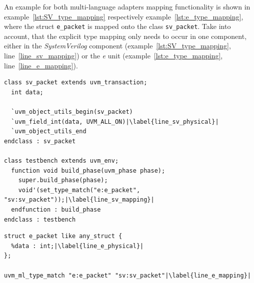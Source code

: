An example for both multi-language adapters mapping functionality is shown in example~\ref{lst:SV_type_mapping}
respectively example~\ref{lst:e_type_mapping}, where the struct \lstinline$e_packet$ is mapped onto the class
\lstinline$sv_packet$. Take into account, that the explicit type mapping only needs to occur in one component, either in
the \emph{SystemVerilog} component (example~\ref{lst:SV_type_mapping}, line~\ref{line_sv_mapping}) or the
\textit{e} unit (example~\ref{lst:e_type_mapping}, line~\ref{line_e_mapping}).

\lstset{language=SystemVerilog, numbers = left, escapechar=|, breaklines=true}
\begin{lstlisting}[frame=htrbl, caption={SystemVerilog: mapping \lstinline$sv_packet$ onto \lstinline$e_packet$},
label={lst:SV_type_mapping}]
class sv_packet extends uvm_transaction;
  int data;
  
  `uvm_object_utils_begin(sv_packet)
  `uvm_field_int(data, UVM_ALL_ON)|\label{line_sv_physical}|
  `uvm_object_utils_end
endclass : sv_packet

class testbench extends uvm_env;
  function void build_phase(uvm_phase phase);
    super.build_phase(phase);
    void'(set_type_match("e:e_packet", "sv:sv_packet"));|\label{line_sv_mapping}|
  endfunction : build_phase
endclass : testbench
\end{lstlisting}

\lstset{language=e, numbers = left, escapechar=|, breaklines=true}
\begin{lstlisting}[frame=htrbl, caption={\textit{e}: mapping \lstinline$sv_packet$ onto \lstinline$e_packet$},
label={lst:e_type_mapping}]
struct e_packet like any_struct {
  %data : int;|\label{line_e_physical}|
};

uvm_ml_type_match "e:e_packet" "sv:sv_packet"|\label{line_e_mapping}|
\end{lstlisting}

